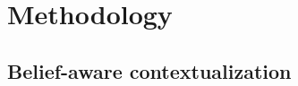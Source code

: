 \documentclass[letterpaper, 10 pt, conference]{ieeeconf}  %
\begin{document}
\section{Methodology}





\subsection{Belief-aware contextualization}
\end{document}
